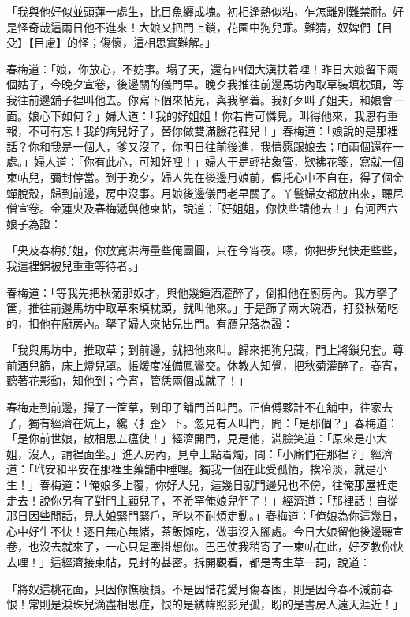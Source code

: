 「我與他好似並頭蓮一處生，比目魚纒成塊。初相逢熱似粘，乍怎離別難禁耐。好是怪奇哉這兩日他不進來！大娘又把門上鎖，花園中狗兒乖。難猜，奴婢們【目殳】【目慮】的怪；傷懷，這相思實難解。」

春梅道：「娘，你放心，不妨事。塌了天，還有四個大漢扶着哩！昨日大娘留下兩個姑子，今晚夕宣卷，後邊關的儀門早。晚夕我推往前邊馬坊內取草裝填枕頭，等我往前邊舖子裡叫他去。你寫下個來帖兒，與我拏着。我好歹叫了姐夫，和娘會一面。娘心下如何？」婦人道：「我的好姐姐！你若肯可憐見，叫得他來，我恩有重報，不可有忘！我的病兒好了，替你做雙滿臉花鞋兒！」春梅道：「娘說的是那裡話？你和我是一個人，爹又沒了，你明日往前後進，我情愿跟娘去；咱兩個還在一處。」婦人道：「你有此心，可知好哩！」婦人于是輕拈象管，欵拂花箋，寫就一個柬帖兒，彌封停當。到于晚夕，婦人先在後邊月娘前，假托心中不自在，得了個金蟬脫殼，歸到前邊，房中沒事。月娘後邊儀門老早關了。丫鬟婦女都放出來，聽尼僧宣卷。金蓮央及春梅遞與他柬帖，說道：「好姐姐，你快些請他去！」有河西六娘子為證：

「央及春梅好姐，你放寬洪海量些俺團圓，只在今宵夜。嗏，你把步兒快走些些，我這裡錦被兒重重等待者。」

春梅道：「等我先把秋菊那奴才，與他幾鍾酒灌醉了，倒扣他在廚房內。我方拏了筐，推往前邊馬坊中取草來填枕頭，就叫他來。」于是篩了兩大碗酒，打發秋菊吃的，扣他在廚房內。拏了婦人柬帖兒出門。有鴈兒落為證：

「我與馬坊中，推取草；到前邊，就把他來叫。歸來把狗兒藏，門上將鎖兒套。尊前酒兒篩，床上燈兒罩。帳煖度准備鳳鸞交。休教人知覺，把秋菊灌醉了。春宵，聽著花影動，知他到；今宵，管恁兩個成就了！」

春梅走到前邊，撮了一筐草，到印子舖門首叫門。正值傅夥計不在舖中，往家去了，獨有經濟在炕上，纔〈扌歪〉下。忽見有人叫門，問：「是那個？」春梅道：「是你前世娘，散相思五瘟使！」經濟開門，見是他，滿臉笑道：「原來是小大姐，沒人，請裡面坐。」進入房內，見卓上點着燭，問：「小廝們在那裡？」經濟道：「玳安和平安在那裡生藥舖中睡哩。獨我一個在此受孤恓，挨冷淡，就是小生！」春梅道：「俺娘多上覆，你好人兒，這幾日就門邊兒也不傍，往俺那屋裡走走去！說你另有了對門主顧兒了，不希罕俺娘兒們了！」經濟道：「那裡話！自從那日因些閒話，見大娘緊門緊戶，所以不耐煩走動。」春梅道：「俺娘為你這幾日，心中好生不快！逐日無心無緒，茶飯懶吃，做事沒入腳處。今日大娘留他後邊聽宣卷，也沒去就來了，一心只是牽掛想你。巴巴使我稍寄了一柬帖在此，好歹教你快去哩！」這經濟接柬帖，見封的甚密。拆開觀看，都是寄生草一詞，說道：

「將奴這桃花面，只因你憔瘦損。不是因惜花愛月傷春困，則是因今春不減前春恨！常則是淚珠兒滴盡相思症，恨的是綉幃照影兒孤，盼的是書房人遠天涯近！」

